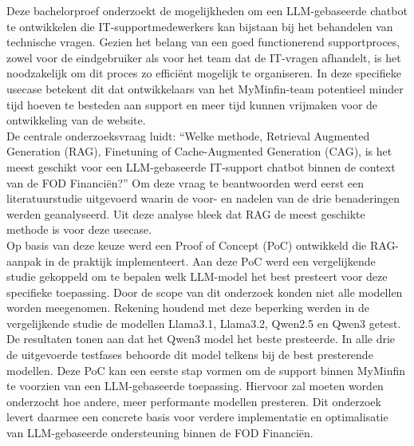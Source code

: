 Deze bachelorproef onderzoekt de mogelijkheden om een LLM-gebaseerde chatbot te ontwikkelen die IT-supportmedewerkers kan bijstaan bij het behandelen van technische vragen. Gezien het belang van een goed functionerend supportproces, zowel voor de eindgebruiker als voor het team dat de IT-vragen afhandelt, is het noodzakelijk om dit proces zo efficiënt mogelijk te organiseren. In deze specifieke usecase betekent dit dat ontwikkelaars van het MyMinfin-team potentieel minder tijd hoeven te besteden aan support en meer tijd kunnen vrijmaken voor de ontwikkeling van de website.
\\[1em]
De centrale onderzoeksvraag luidt: “Welke methode, Retrieval Augmented Generation (RAG), Finetuning of Cache-Augmented Generation (CAG), is het meest geschikt voor een LLM-gebaseerde IT-support chatbot binnen de context van de FOD Financiën?” Om deze vraag te beantwoorden werd eerst een literatuurstudie uitgevoerd waarin de voor- en nadelen van de drie benaderingen werden geanalyseerd. Uit deze analyse bleek dat RAG de meest geschikte methode is voor deze usecase.
\\[1em]
Op basis van deze keuze werd een Proof of Concept (PoC) ontwikkeld die RAG-aanpak in de praktijk implementeert. Aan deze PoC werd een vergelijkende studie gekoppeld om te bepalen welk LLM-model het best presteert voor deze specifieke toepassing. Door de scope van dit onderzoek konden niet alle modellen worden meegenomen. Rekening houdend met deze beperking werden in de vergelijkende studie de modellen Llama3.1, Llama3.2, Qwen2.5 en Qwen3 getest.
\\[1em]
De resultaten tonen aan dat het Qwen3 model het beste presteerde. In alle drie de uitgevoerde testfases behoorde dit model telkens bij de best presterende modellen. Deze PoC kan een eerste stap vormen om de support binnen MyMinfin te voorzien van een LLM-gebaseerde toepassing. Hiervoor zal moeten worden onderzocht hoe andere, meer performante modellen presteren. Dit onderzoek levert daarmee een concrete basis voor verdere implementatie en optimalisatie van LLM-gebaseerde ondersteuning binnen de FOD Financiën.